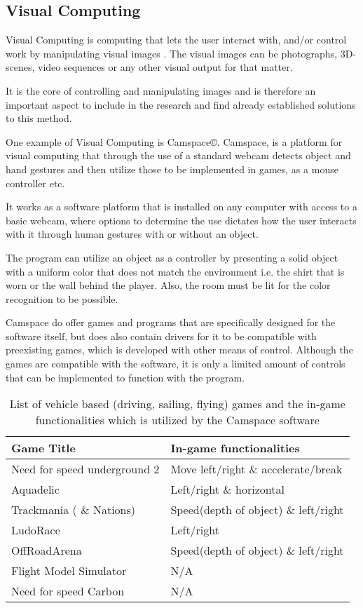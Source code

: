 \subsection{Visual Computing}
Visual Computing is computing that lets the user interact with, and/or control work by manipulating visual images \parencite{Rouse2013}. The visual images can be photographs, 3D-scenes, video sequences or any other visual output for that matter.

It is the core of controlling and manipulating images and is therefore an important aspect to include in the research and find already established solutions to this method.
\bigskip

One example of Visual Computing is Camspace\copyright. Camspace, is a platform for visual computing that through the use of a standard webcam detects object and hand gestures and then utilize those to be implemented in games, as a mouse controller etc. \parencite{Camspace2009}

It works as a software platform that is installed on any computer with access to a basic webcam, where options to determine the use dictates how the user interacts with it through human gestures with or without an object.
\bigskip

The program can utilize an object as a controller by presenting a solid object with a uniform color that does not match the environment i.e. the shirt that is worn or the wall behind the player. Also, the room must be lit for the color recognition to be possible.
\bigskip

Camspace do offer games and programs that are specifically designed for the software itself, but does also contain drivers for it to be compatible with preexisting games, which is developed with other means of control. Although the games are compatible with the software, it is only a limited amount of controls that can be implemented to function with the program.

\begin{table}[h]
\begin{tabular}{| l | l }
Game Title & In-game functionalities\\
\hline \hline
Need for speed underground 2 & Move left/right \& accelerate/break\\
Aquadelic & Left/right \& horizontal\\
Trackmania ( \& Nations) & Speed(depth of object) \& left/right\\
LudoRace & Left/right\\
OffRoadArena & Speed(depth of object) \& left/right\\
Flight Model Simulator & N/A\\
Need for speed Carbon & N/A\\
\end{tabular}
\caption{List of vehicle based (driving, sailing, flying) games and the in-game functionalities which is utilized by the Camspace software\parencite{Camspace2009}}
\label{tab:camspace}
\end{table}

